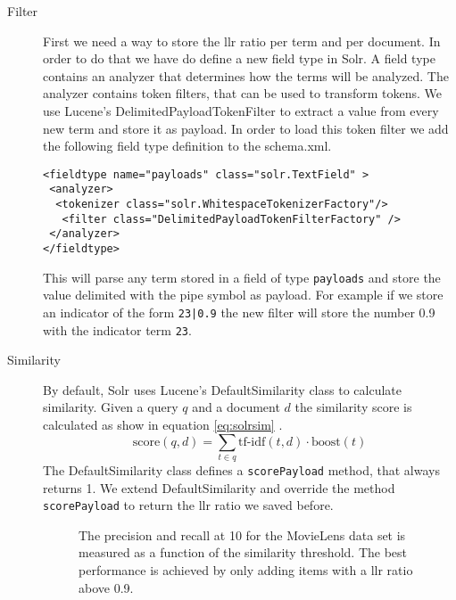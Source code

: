 \begin{description}
\item[Filter] First we need a way to store the \gls{llr} ratio per term and per document. In order to do that we have do define a new field type in Solr. A field type contains an analyzer that determines how the terms will be analyzed. The analyzer contains token filters, that can be used to transform tokens. We use Lucene's DelimitedPayloadTokenFilter to extract a value from every new term and store it as payload. In order to load this token filter we add the following field type definition to the schema.xml.
\begin{lstlisting}[caption={Fieldtype definition for field with payload.}]
<fieldtype name="payloads" class="solr.TextField" >
 <analyzer>
  <tokenizer class="solr.WhitespaceTokenizerFactory"/>
   <filter class="DelimitedPayloadTokenFilterFactory" />
 </analyzer>
</fieldtype>
\end{lstlisting}
This will parse any term stored in a field of type \verb|payloads| and store the value delimited with the pipe symbol as payload. For example if we store an indicator of the form \verb-23|0.9- the new filter will store the number 0.9 with the indicator term \verb|23|.
\item[Similarity] By default, Solr uses Lucene's DefaultSimilarity class to calculate similarity. Given a query $q$ and a document $d$ the similarity score is calculated as show in equation \ref{eq:solrsim} \cite{grainger}.
\begin{equation}
\label{eq:solrsim}
\text{score}(q,d) = \sum_{t \in q} \text{tf-idf}(t,d) \cdot \text{boost}(t) 
\end{equation}
The DefaultSimilarity class defines a \verb|scorePayload| method, that always returns 1. We extend DefaultSimilarity and override the method \verb|scorePayload| to return the \gls{llr} ratio we saved before.

\begin{figure}
  \centering
{}
\caption{The precision and recall at 10 for the MovieLens data set is measured as a function of the similarity threshold. The best performance is achieved by only adding items with a \gls{llr} ratio above 0.9.}
\label{fig:threshold}
\end{figure}


\end{description}
